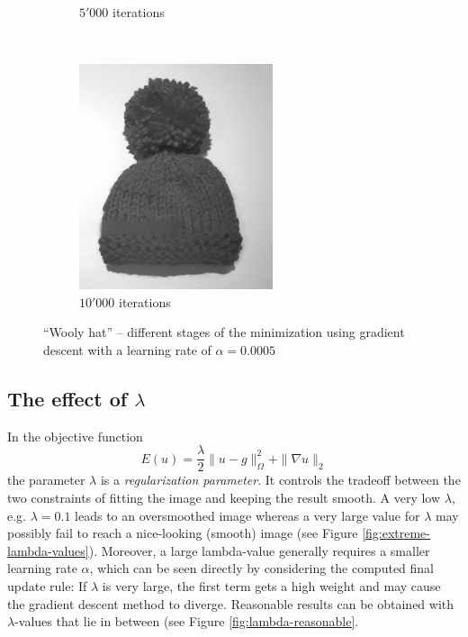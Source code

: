 \documentclass{paper}
\begin{document}
\begin{figure}[ht]
\begin{subfigure}[ht]{0.3\textwidth}
	\caption*{$5'000$ iterations}
\end{subfigure}
~
\begin{subfigure}[ht]{0.3\textwidth}
	\centering
	\includegraphics[width=\textwidth]{hat-iter10000-lambda100-alpha0_001}
	\caption*{$10'000$ iterations}
\end{subfigure}
\caption{``Wooly hat'' -- different stages of the minimization using gradient descent with a learning rate of $\alpha = 0.0005$}
\label{fig:results-hat}
\end{figure}

\subsection*{The effect of $\lambda$}
In the objective function
$$E(u) = \frac{\lambda}{2} \|u-g\|_\Omega^2 + \|\nabla u \|_2$$
the parameter $\lambda$ is a \emph{regularization parameter}. It controls the tradeoff between the two constraints of fitting the image and keeping the result smooth. A very low $\lambda$, e.g. $\lambda = 0.1$ leads to an oversmoothed image whereas a very large value for $\lambda$ may possibly fail to reach a nice-looking (smooth) image (see Figure \ref{fig:extreme-lambda-values}). Moreover, a large lambda-value generally requires a smaller learning rate $\alpha$, which can be seen directly by considering the computed final update rule: If $\lambda$ is very large, the first term gets a high weight and may cause the gradient descent method to diverge. Reasonable results can be obtained with $\lambda$-values that lie in between (see Figure \ref{fig:lambda-reasonable}.
\end{document}
